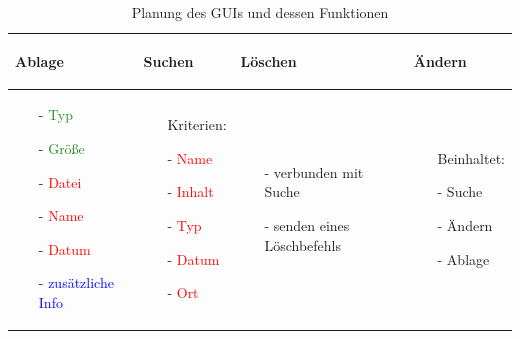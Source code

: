 \documentclass[12pt,a4paper,bibliography=totocnumbered,listof=totocnumbered]{scrartcl}
\begin{document}
\vspace{1em}
\begin{table}[!h]
	\centering
	\begin{tabular}{|p{3.3cm}|p{3.3cm}|p{3.3cm}|p{3.3cm}|}
		\hline
			\begin{center}
				\textbf{Ablage}
			\end{center}
			&
			\begin{center}
				\textbf{Suchen}
			\end{center}
			&
			\begin{center}
				\textbf{Löschen}
			\end{center}
			&
			\begin{center}
				\textbf{Ändern}
			\end{center}
		\\
		\hline
			\begin{itemize}[]
				\item[-]\textcolor{ForestGreen}{Typ}
				\item[-]\textcolor{ForestGreen}{Größe}
				\item[-]\textcolor{red}{Datei}
				\item[-]\textcolor{red}{Name}
				\item[-]\textcolor{red}{Datum}
				\item[-]\textcolor{blue}{zusätzliche Info}
			\end{itemize}
			&
			\begin{itemize}[]
				\item[]Kriterien:
				\item[-]\textcolor{red}{Name}
				\item[-]\textcolor{red}{Inhalt}
				\item[-]\textcolor{red}{Typ}
				\item[-]\textcolor{red}{Datum}
				\item[-]\textcolor{red}{Ort}
			\end{itemize}
			&
			\begin{itemize}[]
				\item[-]verbunden mit Suche
				\item[-]senden eines Löschbefehls
			\end{itemize}
			&
			\begin{itemize}[]
				\item[]Beinhaltet:
				\item[-]Suche
				\item[-]Ändern
				\item[-]Ablage
			\end{itemize}
			\\
		\hline
	\end{tabular}
	\caption{Planung des GUIs und dessen Funktionen}
	\label{tab:PlanungClient}
\end{table}
\end{document}
